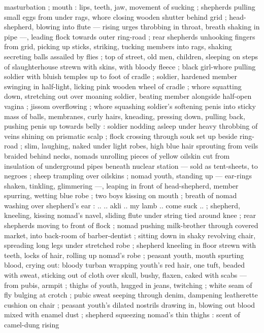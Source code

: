\documentclass[10pt,twoside]{memoir}
\begin{document}
masturbation ; mouth : lips, teeth, jaw, movement of sucking ; 
shepherds pulling small eggs from under rags, whore closing 
wooden shutter behind grid ; head-shepherd, blowing into flute --- 
rising urges throbbing in throat, breath shaking in pipe ---, leading 
flock towards outer ring-road ; rear shepherds unhooking fingers 
from grid, picking up sticks, striking, tucking members into rags, 
shaking secreting balls assailed by flies ; top of street, old men, %
children, sleeping on steps of slaughterhouse strewn with skins, with 
bloody fleece ; black girl-whore pulling soldier with bluish temples up 
to foot of cradle ; soldier, hardened member swinging in half-light, 
licking pink wooden wheel of cradle ; whore squatting down, 
stretching out over moaning soldier, beating member alongside half-open 
vagina ; jissom overflowing ; whore squashing soldier's 
softening penis into sticky mass of balls, membranes, curly hairs, 
kneading, pressing down, pulling back, pushing penis up towards 
belly : soldier nodding asleep under heavy throbbing of veins 
shining on prismatic scalp ; flock crossing through souk set up beside 
ring-road ; slim, laughing, naked under light robes, high blue hair 
sprouting from veils braided behind necks, nomads unrolling pieces 
of yellow oilskin cut from insulation of underground pipes beneath 
nuclear station --- sold as tent-sheets, to negroes ; sheep trampling 
over oilskins ; nomad youth, standing up --- ear-rings shaken, 
tinkling, glimmering ---, leaping in front of head-shepherd, member 
spurring, wetting blue robe ; two boys kissing on mouth ; breath of 
nomad washing over shepherd's ear : .. {\gl} .. akli .. my lamb .. come 
suck .. {\gr} ; shepherd, kneeling, kissing nomad's navel, sliding flute 
under string tied around knee ; rear shepherds moving to front of 
flock ; nomad pushing milk-brother through covered market, into 
back-room of barber-dentist ; sitting down in shaky revolving chair, 
spreading long legs under stretched robe ; shepherd kneeling in 
floor strewn with teeth, locks of hair, rolling up nomad's robe ; 
peasant youth, mouth spurting blood, crying out: bloody turban 
wrapping youth's red hair, one tuft, beaded with sweat, sticking out 
of cloth over skull, bushy, flaxen, caked with scabs --- from pubis, 
armpit ; thighs of youth, hugged in jeans, twitching ; white seam of 
fly bulging at crotch ; pubic sweat seeping through denim, 
dampening leatherette cushion on chair ; peasant youth's dilated 
nostrils drawing in, blowing out blood mixed with enamel dust ; 
shepherd squeezing nomad's thin thighs : scent of camel-dung rising 
\end{document}
